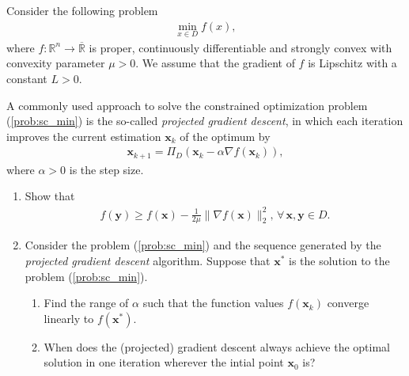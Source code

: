 \documentclass[11pt,letter,notitlepage]{article}
\begin{document}
\newpage
\begin{exercise}
    Consider the following problem 
    \begin{align}\label{prob:sc_min}
        \min_{x\in D}f(x),
    \end{align}
    where $f:\mathbb{R}^{n} \to \overline{\mathbb{R}}$ is proper, continuously differentiable and strongly convex with convexity parameter $\mu>0$. We assume that the gradient of $f$ is Lipschitz with a constant $L>0$. 
    \par A commonly used approach to solve the constrained optimization problem (\ref{prob:sc_min}) is the so-called \emph{projected gradient descent}, in which each iteration improves the current estimation $\mathbf{x}_k$ of the optimum by
    \begin{align*}
        \mathbf{x}_{k+1}=\Pi_{D}(\textbf{x}_k-\alpha\nabla f(\textbf{x}_k)),
    \end{align*}
    where $\alpha>0$ is the step size.
    \begin{enumerate}
        \item Show that
        \begin{align*}
            f(\mathbf{y})\ge f(\mathbf{x})-\frac{1}{2\mu}\|\nabla f(\mathbf{x})\|_2^2, \,\forall\, \mathbf{x},\mathbf{y} \in D.
        \end{align*}
        \item Consider the problem (\ref{prob:sc_min}) and the sequence generated by the \emph{projected gradient descent} algorithm. Suppose that $\mathbf{x}^*$ is the solution to the problem (\ref{prob:sc_min}).
        \begin{enumerate}
            \item Find the range of $\alpha$ such that the function values $f(\mathbf{x}_k)$ converge linearly to $f(\mathbf{x}^*)$.
            \item When does the (projected) gradient descent always achieve the optimal solution in one iteration wherever the intial point $\mathbf{x}_0$ is?
        \end{enumerate}
    \end{enumerate}
\end{exercise}


\begin{solution}

\end{solution}
\end{document}
